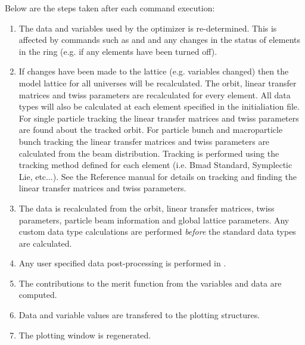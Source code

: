 Below are the steps taken after each \tao command execution:
\begin{enumerate}
  \item 
The data and variables used by the optimizer is re-determined. This is
affected by commands such as  and  and any
changes in the status of elements in the ring (e.g. if any elements
have been turned off).
  \item 
If changes have been made to the lattice (e.g. variables changed) then
the model lattice for all universes will be recalculated. The
 orbit, linear transfer matrices and twiss parameters are
recalculated for every element. All data types will also be calculated
at each element specified in the initialiation file.  For single
particle tracking the linear transfer matrices and twiss parameters
are found about the tracked orbit. For particle bunch and
macroparticle bunch tracking the linear transfer matrices and twiss
parameters are calculated from the beam distribution.  Tracking is
performed using the tracking method defined for each element
(i.e. Bmad Standard, Symplectic Lie, etc...). See the \bmad Reference
manual for details on tracking and finding the linear transfer
matrices and twiss parameters.
  \item 
The  data is recalculated from the  orbit, linear
transfer matrices, twiss parameters, particle beam information and
global lattice parameters.  Any custom data type calculations are
performed \textit{before} the standard \tao data types are calculated.
  \item 
Any user specified data post-processing is performed in
.
  \item 
The contributions to the merit function from the variables and data are
computed.
  \item 
Data and variable values are transfered to the plotting structures.
  \item 
The plotting window is regenerated.
\end{enumerate}

